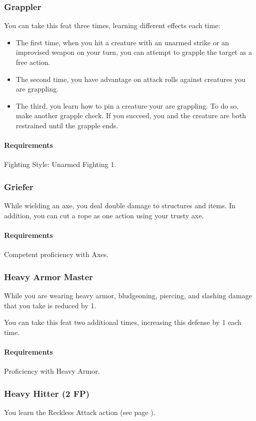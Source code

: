 \subsubsection{Grappler} \label{feat::grappler}
    You can take this feat three times, learning different effects each time:
    \begin{itemize}
        \item The first time, when you hit a creature with an unarmed strike or an improvised weapon on your turn, you can attempt to grapple the target as a free action.
        \item The second time, you have advantage on attack rolls against creatures you are grappling.
        \item The third, you learn how to pin a creature your are grappling.
        To do so, make another grapple check.
        If you succeed, you and the creature are both restrained until the grapple ends.
    \end{itemize}
    \paragraph{Requirements} Fighting Style: Unarmed Fighting 1.
\subsubsection{Griefer} \label{feat::griefer}
    While wielding an axe, you deal double damage to structures and items.
    In addition, you can cut a rope as one action using your trusty axe.
    \paragraph{Requirements} Competent proficiency with Axes.
\subsubsection{Heavy Armor Master} \label{feat::heavyarmormaster}
    While you are wearing heavy armor, bludgeoning, piercing, and slashing damage that you take is reduced by 1.

    You can take this feat two additional times, increasing this defense by 1 each time.
    \paragraph{Requirements} Proficiency with Heavy Armor.
\subsubsection{Heavy Hitter (2 FP)} \label{feat::heavyhitter}
    You learn the Reckless Attack action (see page \pageref{act::recklessattack}).

